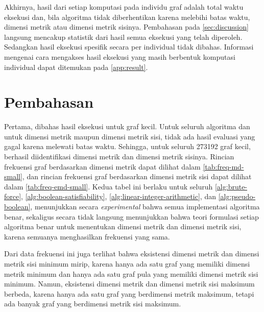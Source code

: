 \documentclass[10pt,twocolumn]{article}
\newcommand{\foreign}[1]{\foreignlanguage{english}{\textit{#1}}}
\newcommand{\minipagewidth}{\linewidth}
\begin{document}
Akhirnya, hasil dari setiap komputasi pada individu graf adalah total waktu eksekusi dan, bila algoritma tidak diberhentikan karena melebihi batas waktu, dimensi metrik atau dimensi metrik sisinya. Pembahasan pada \autoref{sec:discussion} langsung mencakup statistik dari hasil semua eksekusi yang telah diperoleh. Sedangkan hasil eksekusi spesifik secara per individual tidak dibahas. Informasi mengenai cara mengakses hasil eksekusi yang masih berbentuk komputasi individual dapat ditemukan pada \cref{app:result}.

\section{Pembahasan}
\label{sec:discussion}

Pertama, dibahas hasil eksekusi untuk graf kecil. Untuk seluruh algoritma dan untuk dimensi metrik maupun dimensi metrik sisi, tidak ada hasil evaluasi yang gagal karena melewati batas waktu. Sehingga, untuk seluruh 273192 graf kecil, berhasil diidentifikasi dimensi metrik dan dimensi metrik sisinya. Rincian frekuensi graf berdasarkan dimensi metrik dapat dilihat dalam \autoref{tab:freq-md-small}, dan rincian frekuensi graf berdasarkan dimensi metrik sisi dapat dilihat dalam \autoref{tab:freq-emd-small}. Kedua tabel ini berlaku untuk seluruh \autoref{alg:brute-force}, \autoref{alg:boolean-satisfiability}, \autoref{alg:linear-integer-arithmetic}, dan \autoref{alg:pseudo-boolean}, menunjukkan secara \foreign{experimental} bahwa semua implementasi algoritma benar, sekaligus secara tidak langsung menunjukkan bahwa teori formulasi setiap algoritma benar untuk menentukan dimensi metrik dan dimensi metrik sisi, karena semuanya menghasilkan frekuensi yang sama.

Dari data frekuensi ini juga terlihat bahwa eksistensi dimensi metrik dan dimensi metrik sisi minimum mirip, karena hanya ada satu graf yang memiliki dimensi metrik minimum dan hanya ada satu graf pula yang memiliki dimensi metrik sisi minimum. Namun, eksistensi dimensi metrik dan dimensi metrik sisi maksimum berbeda, karena hanya ada satu graf yang berdimensi metrik maksimum, tetapi ada banyak graf yang berdimensi metrik sisi maksimum.

\begin{center}
	\renewcommand{\minipagewidth}{0.9\linewidth}

	

	\vspace{1em}

	
\end{center}
\end{document}
